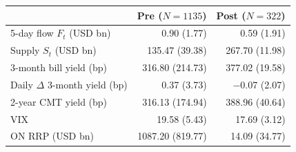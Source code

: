 \begin{tabular}{lrr}
\toprule
 & Pre ($N=1135$) & Post ($N=322$) \\
\midrule
5-day flow $F_t$ (USD bn) & 0.90 (1.77) & 0.59 (1.91) \\
Supply $S_t$ (USD bn) & 135.47 (39.38) & 267.70 (11.98) \\
3-month bill yield (bp) & 316.80 (214.73) & 377.02 (19.58) \\
Daily $\Delta$ 3-month yield (bp) & 0.37 (3.73) & \ensuremath{-}0.07 (2.07) \\
2-year CMT yield (bp) & 316.13 (174.94) & 388.96 (40.64) \\
VIX & 19.58 (5.43) & 17.69 (3.12) \\
ON RRP (USD bn) & 1087.20 (819.77) & 14.09 (34.77) \\
\bottomrule
\end{tabular}
